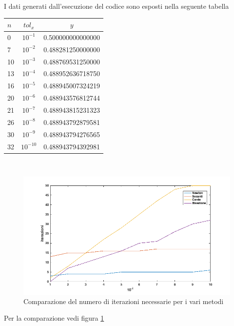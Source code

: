 

I dati generati dall'esecuzione del codice sono esposti  nella seguente tabella

\begin{tabular}{|l|c|c|}
\hline
$n$ & $tol_x$ & $y$ \\
\hline
0 & $10^{-1}$ & 0.500000000000000 \\
7 & $10^{-2}$ & 0.488281250000000 \\
10 & $10^{-3}$ &  0.488769531250000 \\
13 & $10^{-4}$ & 0.488952636718750 \\
16 & $10^{-5}$ & 0.488945007324219 \\
20 & $10^{-6}$ & 0.488943576812744 \\
21 & $10^{-7}$ & 0.488943815231323 \\
26 & $10^{-8}$ & 0.488943792879581 \\
30 & $10^{-9}$ & 0.488943794276565 \\
32 & $10^{-10}$ & 0.488943794392981 \\
\hline
\end{tabular}\\
\begin{figure}[b]
\includegraphics[scale=0.7]{cap_2/es7/compar}
\caption{Comparazione del numero di iterazioni necessarie per i vari metodi}
\label{compar}
\end{figure}
Per la comparazione vedi figura \ref{compar}
